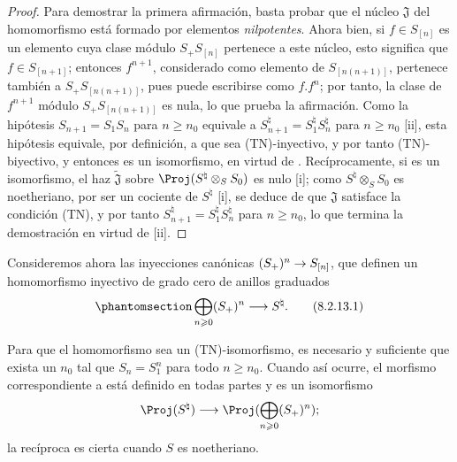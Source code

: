 \documentclass[oneside,10pt]{amsart}
\makeatletter
\renewcommand{\geq}{\geqslant}
\newcommand{\ega@arrow}[2]{\mathchoice{#1}{#2}{#2}{#2}}
\renewcommand{\to}{\ega@arrow{\longrightarrow}{\rightarrow}}
\let\EGAOriginalLabel\label
\renewcommand{\label}[1]{\phantomsection\EGAOriginalLabel{#1}}
\makeatother
\begin{document}
\begin{proof}
Para demostrar la primera afirmación, basta  probar que el núcleo $\mathfrak J$ del homomorfismo  está formado por elementos \emph{nilpotentes}.
Ahora bien, si $f\in S_{[n]}$ es un elemento cuya clase módulo $S_+S_{[n]}$ pertenece a este núcleo, esto significa que $f\in S_{[n+1]}$;
entonces $f^{n+1}$, considerado como elemento de $S_{[n(n+1)]}$, pertenece también a $S_+S_{[n(n+1)]}$, pues puede escribirse como $f.f^n$;
por tanto, la clase de $f^{n+1}$ módulo $S_+S_{[n(n+1)]}$ es nula, lo que prueba la afirmación.
Como la hipótesis $S_{n+1}=S_1S_n$ para $n\geq n_0$ equivale a $S_{n+1}^\natural=S_1^\natural S_n^\natural$ para $n\geq n_0$ [ii], esta hipótesis equivale, por definición, a que  sea (TN)-inyectivo, y por tanto (TN)-biyectivo, y entonces  es un isomorfismo, en virtud de .
Recíprocamente, si  es un isomorfismo, el haz $\widetilde{\mathfrak J}$ sobre $\Proj(S^\natural\otimes_S S_0)$ es nulo [i];
como $S^\natural\otimes_S S_0$ es noetheriano, por ser un cociente de $S^\natural$ [i], se deduce de  que $\mathfrak J$ satisface la condición (TN), y por tanto $S_{n+1}^\natural=S_1^\natural S_n^\natural$ para $n\geq n_0$, lo que termina la demostración en virtud de [ii].
\end{proof}

\begin{env}[8.2.13]
\label{II.8.2.13}
Consideremos ahora las inyecciones canónicas $(S_+)^n\to S_{[n]}$, que definen un homomorfismo inyectivo de grado cero de anillos graduados
\[
\label{II.8.2.13.1}
  \bigoplus_{n\geq0} (S_+)^n \to S^\natural.
\tag{8.2.13.1}
\]
\end{env}

\begin{proposition}[8.2.14]
\label{II.8.2.14}
Para que el homomorfismo  sea un \textup{(TN)}-isomorfismo, es necesario y suficiente que exista un $n_0$ tal que $S_n=S_1^n$ para todo $n\geq n_0$.
Cuando así ocurre, el morfismo correspondiente a  está definido en todas partes y es un isomorfismo
\[
  \Proj(S^\natural) \to \Proj(\bigoplus_{n\geq0}(S_+)^n);
\]
la recíproca es cierta cuando $S$ es noetheriano.
\end{proposition}
\end{document}
